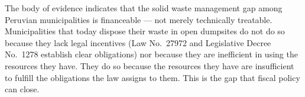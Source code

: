 The body of evidence indicates that the solid waste management gap among Peruvian municipalities is financeable --- not merely technically treatable. Municipalities that today dispose their waste in open dumpsites do not do so because they lack legal incentives (Law No.\ 27972 and Legislative Decree No.\ 1278 establish clear obligations) nor because they are inefficient in using the resources they have. They do so because the resources they have are insufficient to fulfill the obligations the law assigns to them. This is the gap that fiscal policy can close.
